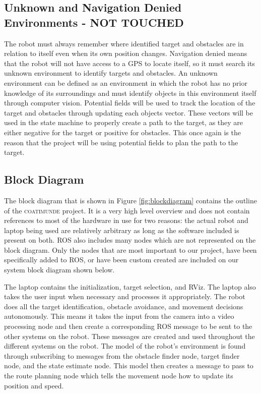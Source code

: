 \documentclass{article}
\begin{document}
	\subsection{Unknown and Navigation Denied Environments - NOT TOUCHED}

	The robot must always remember where identified target and obstacles are in relation to itself even when its own position changes. Navigation denied means that the robot will not have access to a GPS to locate itself, so it must search its unknown environment to identify targets and obstacles. An unknown environment can be defined as an environment in which the robot has no prior knowledge of its surroundings and must identify objects in this environment itself through computer vision. Potential fields will be used to track the location of the target and obstacles through updating each objects vector. These vectors will be used in the state machine to properly create a path to the target, as they are either negative for the target or positive for obstacles. This once again is the reason that the project will be using potential fields to plan the path to the target. 


	\subsection{Block Diagram}
	
	The block diagram that is shown in Figure \ref{fig:blockdiagram} contains the outline of the \textsc{coatimunde} project. It is a very high level overview and does not contain references to most of the hardware in use for two reasons: the actual robot and laptop being used are relatively arbitrary as long as the software included is present on both. ROS also includes many nodes which are not represented on the block diagram. Only the nodes that are most important to our project, have been specifically added to ROS, or have been custom created are included on our system block diagram shown below.
	
	The laptop contains the initialization, target selection, and RViz. The laptop also takes the user input when necessary and processes it appropriately.  The robot does all the target identification, obstacle avoidance, and movement decisions autonomously. This means it takes the input from the camera into a video processing node and then create a corresponding ROS message to be sent to the other systems on the robot. These messages are created and used throughout the different systems on the robot. The model of the robot's environment is found through subscribing to messages from the obstacle finder node, target finder node, and the state estimate node. This model then creates a message to pass to the route planning node which tells the movement node how to update its position and speed. 
	
\end{document}
